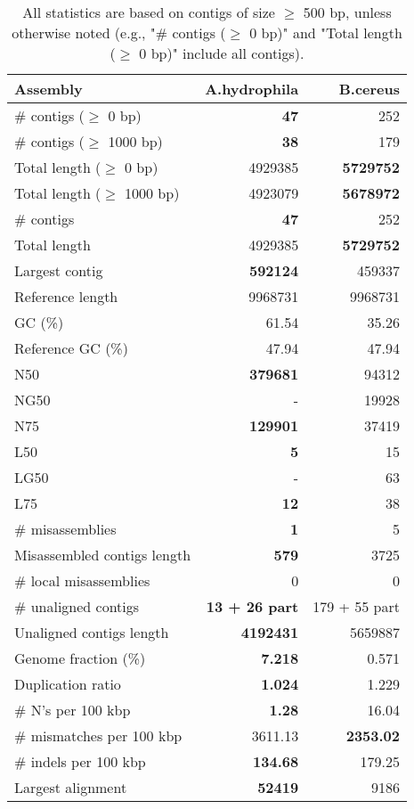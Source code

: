 \documentclass[12pt,a4paper]{article}
\begin{document}
\begin{table}[ht]
\begin{center}
\caption{All statistics are based on contigs of size $\geq$ 500 bp, unless otherwise noted (e.g., "\# contigs ($\geq$ 0 bp)" and "Total length ($\geq$ 0 bp)" include all contigs).}
\begin{tabular}{|l*{2}{|r}|}
\hline
Assembly & A.hydrophila & B.cereus \\ \hline
\# contigs ($\geq$ 0 bp) & {\bf 47} & 252 \\ \hline
\# contigs ($\geq$ 1000 bp) & {\bf 38} & 179 \\ \hline
Total length ($\geq$ 0 bp) & 4929385 & {\bf 5729752} \\ \hline
Total length ($\geq$ 1000 bp) & 4923079 & {\bf 5678972} \\ \hline
\# contigs & {\bf 47} & 252 \\ \hline
Total length & 4929385 & {\bf 5729752} \\ \hline
Largest contig & {\bf 592124} & 459337 \\ \hline
Reference length & 9968731 & 9968731 \\ \hline
GC (\%) & 61.54 & 35.26 \\ \hline
Reference GC (\%) & 47.94 & 47.94 \\ \hline
N50 & {\bf 379681} & 94312 \\ \hline
NG50 & - & 19928 \\ \hline
N75 & {\bf 129901} & 37419 \\ \hline
L50 & {\bf 5} & 15 \\ \hline
LG50 & - & 63 \\ \hline
L75 & {\bf 12} & 38 \\ \hline
\# misassemblies & {\bf 1} & 5 \\ \hline
Misassembled contigs length & {\bf 579} & 3725 \\ \hline
\# local misassemblies & 0 & 0 \\ \hline
\# unaligned contigs & {\bf 13 + 26 part} & 179 + 55 part \\ \hline
Unaligned contigs length & {\bf 4192431} & 5659887 \\ \hline
Genome fraction (\%) & {\bf 7.218} & 0.571 \\ \hline
Duplication ratio & {\bf 1.024} & 1.229 \\ \hline
\# N's per 100 kbp & {\bf 1.28} & 16.04 \\ \hline
\# mismatches per 100 kbp & 3611.13 & {\bf 2353.02} \\ \hline
\# indels per 100 kbp & {\bf 134.68} & 179.25 \\ \hline
Largest alignment & {\bf 52419} & 9186 \\ \hline
\end{tabular}
\end{center}
\end{table}
\end{document}
